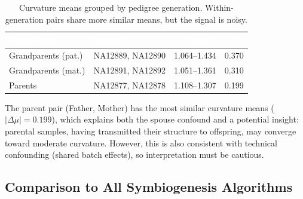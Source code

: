 \documentclass{../yalumba}
\begin{document}
\begin{table}[H]
  \centering
  \tablestyle
  \caption{Curvature means grouped by pedigree generation.  Within-generation
    pairs share more similar means, but the signal is noisy.}
  \label{tab:mean-clustering}
  \begin{tabular}{llcc}
    \toprule
    \rowcolor{table-header}
    \textcolor{white}{\textbf{Generation}} &
    \textcolor{white}{\textbf{Samples}} &
    \textcolor{white}{\textbf{$\mu$ range}} &
    \textcolor{white}{\textbf{$|\Delta\mu|$}} \\
    \midrule
    Grandparents (pat.) & NA12889, NA12890 & 1.064--1.434 & 0.370 \\
    Grandparents (mat.) & NA12891, NA12892 & 1.051--1.361 & 0.310 \\
    Parents              & NA12877, NA12878 & 1.108--1.307 & 0.199 \\
    \bottomrule
  \end{tabular}
\end{table}

The parent pair (Father, Mother) has the most similar curvature means
($|\Delta\mu| = 0.199$), which explains both the spouse confound and a
potential insight: parental samples, having transmitted their structure to
offspring, may converge toward moderate curvature.  However, this is also
consistent with technical confounding (shared batch effects), so
interpretation must be cautious.

\subsection{Comparison to All Symbiogenesis Algorithms}
\end{document}
